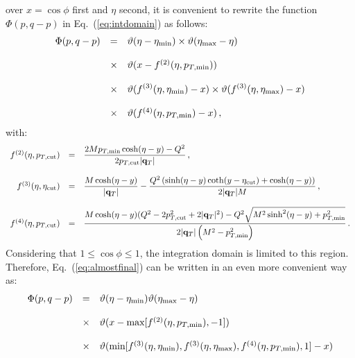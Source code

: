 \documentclass[10pt,a4paper]{article}
\begin{document}
over $x=\cos\phi$ first and $\eta$ second, it is convenient to rewrite
the function $\Phi(p,q-p)$ in Eq.~(\ref{eq:intdomain}) as follows:
\begin{equation}\label{eq:almostfinal}
\begin{array}{rcl}
\Phi(p,q-p) &=&\displaystyle \vartheta(\eta-\eta_{\rm min}) \times
\vartheta(\eta_{\rm max}-\eta) \\
\\
&\times& \vartheta(x - f^{(2)}(\eta,
                p_{T,\rm min})) \\
\\
&\times&\displaystyle
         \vartheta(f^{(3)}(\eta,\eta_{\rm min})-x) \times \vartheta(f^{(3)}(\eta,\eta_{\rm max})-x)\\
\\
&\times&\vartheta(f^{(4)}(\eta,
         p_{T,\rm min})-x)\,,
\end{array}
\end{equation}
with:
\begin{equation}\label{eq:relevantfuncs}
\begin{array}{rcl}
f^{(2)}(\eta, p_{T,\rm cut}) & = &\displaystyle \frac{2M p_{T,\rm min}\cosh(\eta-y) 
                    - Q^{2}}{2p_{T,\rm cut}
                    |\mathbf{q}_T|}\,, \\
\\
f^{(3)}(\eta,\eta_{\rm cut}) & = &\displaystyle \frac{M \cosh(\eta-y)}{|\mathbf{q}_T|
                    }-\frac{Q^{2} \left(\sinh(\eta
                                   -y)\coth(y-\eta_{\rm cut})+\cosh(\eta-y)\right)}{2|\mathbf{q}_T|  M}\,,\\
\\
f^{(4)}(\eta, p_{T,\rm cut}) & = &\displaystyle \frac{M \cosh(\eta-y)(Q^2 - 2
                    p_{T,\rm cut}^{2} + 2 |\mathbf{q}_T|^2)- Q^{2} \sqrt{M^{2} \sinh ^{2} (\eta-y) + p_{T,\rm min}^{2} }}{2 |\mathbf{q}_T| \left(M^{2} - p_{T,\rm min}^{2}\right)}\,.
\end{array}
\end{equation}
Considering that $1\leq\cos\phi\leq 1$, the integration domain is
limited to this region. Therefore, Eq.~(\ref{eq:almostfinal}) can be
written in an even more convenient way as:
\begin{equation}\label{eq:final}
\begin{array}{rcl}
\Phi(p,q-p) &=& \vartheta(\eta-\eta_{\rm min})\vartheta(\eta_{\rm
  max}-\eta)  \\
\\
&\times&\vartheta(x -
  \mbox{max}[f^{(2)}(\eta,p_{T,\rm min}),-1])\\
\\
&\times&\vartheta(\mbox{min}[f^{(3)}(\eta,\eta_{\rm min}),f^{(3)}(\eta,\eta_{\rm
         max}), f^{(4)}(\eta,p_{T,\rm
         min}),1]-x)
\end{array}
\end{equation}
\end{document}
